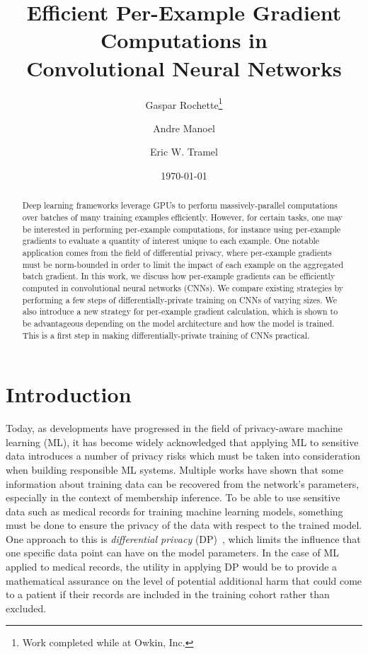 \documentclass[11pt]{article}
\title{Efficient Per-Example Gradient Computations in\\ Convolutional Neural Networks}
\author[1]{Gaspar Rochette\footnote{Work completed while at Owkin, Inc.}}
\author[2]{Andre Manoel}
\author[2]{Eric W. Tramel}
\affil[1]{{ENS, PSL University, Paris, France}}
\affil[2]{Owkin, Inc. New York, NY}
\date{\today}
\begin{document}
\maketitle

\begin{abstract}
    Deep learning frameworks leverage GPUs to perform massively-parallel
    computations over batches of many training examples efficiently.
    However, for certain tasks, one may be interested in performing
    per-example computations, for instance using per-example gradients to
    evaluate a quantity of interest unique to each example.  One notable
    application comes from the field of differential privacy, where
    per-example gradients must be norm-bounded in order to limit the impact
    of each example on the aggregated batch gradient.  In this work, we
    discuss how per-example gradients can be efficiently computed in
    convolutional neural networks (CNNs). We compare existing strategies by
    performing a few steps of differentially-private training on CNNs of
    varying sizes.  We also introduce a new strategy for per-example
    gradient calculation, which is shown to be advantageous depending on the
    model architecture and how the model is trained. This is a first step in
    making differentially-private training of CNNs practical.
\end{abstract}

\section{Introduction}

Today, as developments have progressed in the field of privacy-aware machine
learning (ML), it has become widely acknowledged that applying ML to
sensitive data introduces a number of privacy risks which must be taken into
consideration when building responsible ML systems.  Multiple works
\cite{shokri2017membership,carlini2018secret,melis2019exploiting,yeom2018privacy}
have shown that some information about training data can be recovered from
the network's parameters, especially in the context of membership inference.
To be able to use sensitive data such as medical records for training
machine learning models, something must be done to ensure the privacy of the data
with respect to the trained model. One approach
to this is \emph{differential privacy} (DP)~\cite{dwork2014algorithmic},
which limits the influence that one specific data point can have on the model
parameters. In the case of ML applied to medical records, the utility in
applying DP would be to provide a mathematical assurance on the level of
potential additional harm that could come to a patient if their records are
included in the training cohort rather than excluded.
\end{document}
